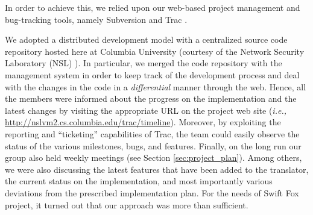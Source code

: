 In order to achieve this, we relied upon our web-based project management
and bug-tracking tools, namely Subversion \cite{svn} and Trac \cite{trac}.

We adopted a distributed development model with a centralized source code
repository hosted here at Columbia University (courtesy of the Network
Security Laboratory (NSL) \cite{nsl}). In particular, we merged the code
repository with the management system in order to keep track of the
development process and deal with the changes in the code in a
\textit{differential} manner through the web. Hence, all the members were
informed about the progress on the implementation and the latest changes
by visiting the appropriate URL on the project web site
(\textit{i.e.,} \url{http://nslvm2.cs.columbia.edu/trac/timeline}).
Moreover, by exploiting the reporting and ``ticketing'' capabilities of
Trac, the team could easily observe the status of the various milestones,
bugs, and features. Finally, on the long run our group also held weekly
meetings (see Section \ref{sec:project_plan}). Among others, we were also
discussing the latest features that have been added to the translator, the
current status on the implementation, and most importantly various
deviations from the prescribed implementation plan. For the needs of
Swift Fox project, it turned out that our approach was more than sufficient.
